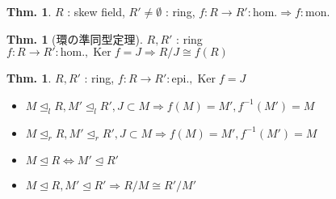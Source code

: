 \documentclass[uplatex,dvipdfmx,9pt]{beamer}
\newcommand{\inverse}[1]{#1^{-1}}
\newcommand{\Ker}{\operatorname{Ker}}
\newcommand{\lideal}{\trianglelefteq_l}
\newcommand{\rideal}{\trianglelefteq_r}
\newcommand{\ideal}{\trianglelefteq}
\renewcommand{\hom}{\text{hom.}} %
\newcommand{\mon}{\text{mon.}} %
\newcommand{\epi}{\text{epi.}} %
\newcounter{textThmCount}
\theoremstyle{definition} %
\newtheorem{thm}{Thm.}[subsection] %
\newtheorem{thmText}[textThmCount]{Thm.}
\theoremstyle{example}
\begin{document}
    \begin{frame}

      \begin{thm}
        $R$ : skew field, $R' \neq \emptyset$ : ring, $f\colon R \to R' : \hom \Rightarrow f : \mon$
      \end{thm}

      \begin{thmText}[環の準同型定理]
        $R, R'$ : ring \\
        $f\colon R \to R' : \hom, \Ker f = J \Rightarrow R/J \cong f(R)$ 
      \end{thmText}

      \begin{thmText}
         $R, R'$ : ring, $f\colon R \to R' : \epi, \Ker f = J$
        \begin{itemize}
          \item $M \lideal R, M' \lideal R', J \subset M \Rightarrow f(M) = M', \inverse{f}(M') = M$
          \item $M \rideal R, M' \rideal R', J \subset M \Rightarrow f(M) = M', \inverse{f}(M') = M$
          \item $M \ideal R \Leftrightarrow M' \ideal R'$
          \item $M \ideal R, M' \ideal R' \Rightarrow R/M \cong R'/M'$
        \end{itemize}       
      \end{thmText}
      
    \end{frame}
\end{document}
